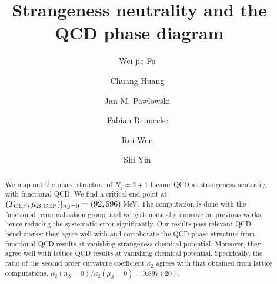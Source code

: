 \documentclass[reprint,twocolumn,superscriptaddress,preprintnumbers,amsmath,amssymb,aps,prd,floatfix]{revtex4-2}
\begin{document}
\title{Strangeness neutrality and the QCD phase diagram}

\author{Wei-jie Fu \,}

\author{Chuang Huang \, }
  
\author{Jan M. Pawlowski \,}

\author{Fabian Rennecke \,}

\author{Rui Wen \,}
	
\author{Shi Yin \,}


\begin{abstract}

We map out the phase structure of $N_f=2+1$ flavour QCD at strangeness neutrality with functional QCD. We find a critical end point at $(T_{\rm CEP},\mu_{B,{\rm CEP}})|_{n_S=0} = (92, 696)$\,MeV. The computation is done with the functional renormalisation group, and we systematically improve on previous works, hence reducing the systematic error significantly. Our results pass relevant QCD benchmarks: they agree well with and corroborate the QCD phase structure from functional QCD results at vanishing strangeness chemical potential. Moreover, they agree  well with lattice QCD results at vanishing chemical potential. Specifically, the ratio of the second order curvature coefficient $\kappa_2$ agrees with that obtained from lattice computations, $\kappa_2(n_S=0)/\kappa_2(\mu_S=0)=0.897(20)$.   

\end{abstract}
\end{document}
